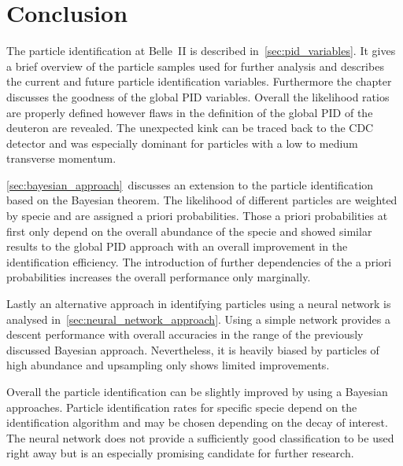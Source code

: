 \chapter{Conclusion}
\label{chap:conclusion}

The particle identification at Belle~\RN{2} is described in~\autoref{sec:pid_variables}. It gives a brief overview of the particle samples used for further analysis and describes the current and future particle identification variables. Furthermore the chapter discusses the goodness of the global PID variables. Overall the likelihood ratios are properly defined however flaws in the definition of the global PID of the deuteron are revealed. The unexpected kink can be traced back to the CDC detector and was especially dominant for particles with a low to medium transverse momentum.

\autoref{sec:bayesian_approach}~discusses an extension to the particle identification based on the Bayesian theorem. The likelihood of different particles are weighted by specie and are assigned a priori probabilities. Those a priori probabilities at first only depend on the overall abundance of the specie and showed similar results to the global PID approach with an overall improvement in the identification efficiency. The introduction of further dependencies of the a priori probabilities increases the overall performance only marginally.

Lastly an alternative approach in identifying particles using a neural network is analysed in~\autoref{sec:neural_network_approach}. Using a simple network provides a descent performance with overall accuracies in the range of the previously discussed Bayesian approach. Nevertheless, it is heavily biased by particles of high abundance and upsampling only shows limited improvements.

Overall the particle identification can be slightly improved by using a Bayesian approaches. Particle identification rates for specific specie depend on the identification algorithm and may be chosen depending on the decay of interest. The neural network does not provide a sufficiently good classification to be used right away but is an especially promising candidate for further research.
